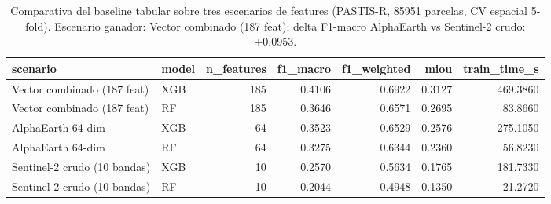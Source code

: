 \begin{table}
\caption{Comparativa del baseline tabular sobre tres escenarios de features (PASTIS-R, 85951 parcelas, CV espacial 5-fold). Escenario ganador: Vector combinado (187 feat); delta F1-macro AlphaEarth vs Sentinel-2 crudo: +0.0953.}
\label{tab:baseline-comparison}
\begin{tabular}{llrrrrr}
\toprule
scenario & model & n\_features & f1\_macro & f1\_weighted & miou & train\_time\_s \\
\midrule
Vector combinado (187 feat) & XGB & 185 & 0.4106 & 0.6922 & 0.3127 & 469.3860 \\
Vector combinado (187 feat) & RF & 185 & 0.3646 & 0.6571 & 0.2695 & 83.8660 \\
AlphaEarth 64-dim & XGB & 64 & 0.3523 & 0.6529 & 0.2576 & 275.1050 \\
AlphaEarth 64-dim & RF & 64 & 0.3275 & 0.6344 & 0.2360 & 56.8230 \\
Sentinel-2 crudo (10 bandas) & XGB & 10 & 0.2570 & 0.5634 & 0.1765 & 181.7330 \\
Sentinel-2 crudo (10 bandas) & RF & 10 & 0.2044 & 0.4948 & 0.1350 & 21.2720 \\
\bottomrule
\end{tabular}
\end{table}
